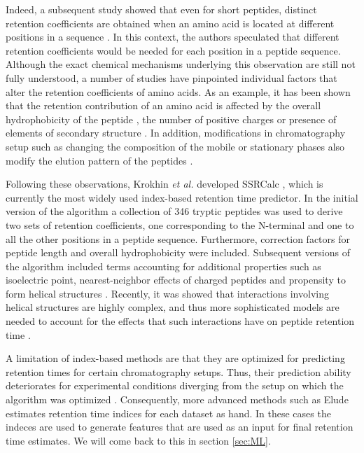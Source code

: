 \documentclass[a4paper]{article}
\begin{document}



Indeed, a subsequent study showed that even for short peptides,
distinct retention coefficients are obtained when an amino acid is
located at different positions in a sequence \cite{Houghten1987}. In
this context, the authors speculated that different retention
coefficients would be needed for each position in a peptide
sequence. Although the exact chemical mechanisms underlying this
observation are still not fully understood, a number of studies have
pinpointed individual factors that alter the retention coefficients of
amino acids. As an example, it has been shown that the retention
contribution of an amino acid is affected by the overall
hydrophobicity of the peptide \cite{Mant2006}, the number of positive
charges \cite{Mant2006} or presence of elements of secondary
structure \cite{Zhou1990}. In addition, modifications in
chromatography setup such as changing the composition of the mobile or
stationary phases also modify the elution pattern of the
peptides \cite{Browne1982, Guo1987, Gilar2010}.


Following these observations, Krokhin {\em et al.} developed {\sc
SSRCalc} \cite{Krokhin2004}, which is currently the most widely used
index-based retention time predictor. In the initial version of the
algorithm a collection of 346 tryptic peptides was used to derive two
sets of retention coefficients, one corresponding to the N-terminal
and one to all the other positions in a peptide sequence. Furthermore,
correction factors for peptide length and overall hydrophobicity were
included. Subsequent versions of the algorithm included terms
accounting for additional properties such as isoelectric point,
nearest-neighbor effects of charged peptides and propensity to form
helical structures \cite{Krokhin2006}. Recently, it was showed that
interactions involving helical structures are highly complex, and thus
more sophisticated models are needed to account for the effects that
such interactions have on peptide retention time \cite{ah}.

A limitation of index-based methods are that they are optimized for
predicting retention times for certain chromatography setups. Thus,
their prediction ability deteriorates for experimental conditions
diverging from the setup on which the algorithm was optimized
\cite{Spicer2007}. Consequently, more advanced methods such as {\sc
Elude} \cite{elude1,elude2} estimates retention time indices for each
dataset as hand. In these cases the indeces are used to generate
features that are used as an input for final retention time
estimates. We will come back to this in section \ref{sec:ML}. 
\end{document}
